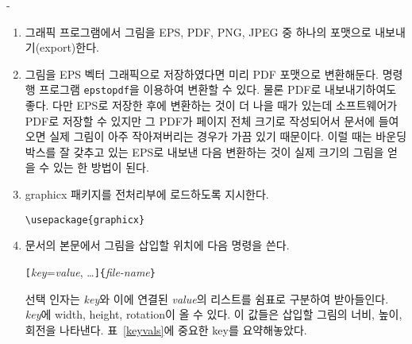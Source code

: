 \begin{adjustwidth}{0pt}{-\margheadwidth}
\begin{enumerate} \firmlist 
\item 그래픽 프로그램에서 그림을 EPS, PDF, PNG, JPEG 중 하나의 포맷으로 내보내기(export)한다.
\item 그림을 EPS 벡터 그래픽으로 저장하였다면 미리 PDF 포맷으로 변환해둔다. 명령행 프로그램 \texttt{epstopdf}을 이용하여 변환할 수 있다. 
물론 PDF로 내보내기하여도 좋다. 다만 
EPS로 저장한 후에 변환하는 것이 더 나을 때가 있는데 소프트웨어가 PDF로 저장할 수 있지만 그 PDF가 페이지 전체 크기로 작성되어서 문서에 들여오면 실제 그림이 아주 작아져버리는 경우가 가끔 있기 때문이다. 이럴 때는 바운딩박스를 잘 갖추고 있는 EPS로 내보낸 다음 변환하는 것이 실제 크기의 그림을 얻을 수 있는 한 방법이 된다.
\item \textsf{graphicx} 패키지를 전처리부에 로드하도록 지시한다.
\begin{lscommand}
  \verb|\usepackage{graphicx}|
\end{lscommand}
\item 문서의 본문에서 그림을 삽입할 위치에 다음 명령을 쓴다.
\begin{lscommand}
\verb|[|\emph{key}=\emph{value}, \ldots\verb|]{|\emph{file-name}\verb|}|
\end{lscommand}
\noindent 선택 인자는 \emph{key}와 이에 연결된 \emph{value}의 리스트를 쉼표로 구분하여 받아들인다. \emph{key}에 
width, height, rotation이 올 수 있다. 이 값들은 삽입할 그림의 너비, 높이, 회전을 나타낸다. 표~\ref{keyvals}에
중요한 key를 요약해놓았다.
\end{enumerate}


\end{adjustwidth}
